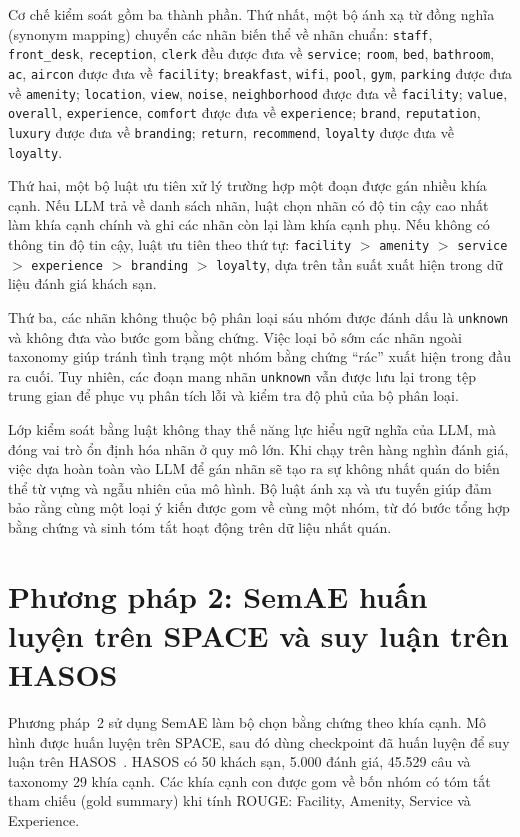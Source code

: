 \documentclass[12pt,a4paper]{report}
\begin{document}
Cơ chế kiểm soát gồm ba thành phần. Thứ nhất, một bộ ánh xạ từ đồng nghĩa (synonym mapping) chuyển các nhãn biến thể về nhãn chuẩn: \texttt{staff}, \texttt{front\_desk}, \texttt{reception}, \texttt{clerk} đều được đưa về \texttt{service}; \texttt{room}, \texttt{bed}, \texttt{bathroom}, \texttt{ac}, \texttt{aircon} được đưa về \texttt{facility}; \texttt{breakfast}, \texttt{wifi}, \texttt{pool}, \texttt{gym}, \texttt{parking} được đưa về \texttt{amenity}; \texttt{location}, \texttt{view}, \texttt{noise}, \texttt{neighborhood} được đưa về \texttt{facility}; \texttt{value}, \texttt{overall}, \texttt{experience}, \texttt{comfort} được đưa về \texttt{experience}; \texttt{brand}, \texttt{reputation}, \texttt{luxury} được đưa về \texttt{branding}; \texttt{return}, \texttt{recommend}, \texttt{loyalty} được đưa về \texttt{loyalty}.

Thứ hai, một bộ luật ưu tiên xử lý trường hợp một đoạn được gán nhiều khía cạnh. Nếu LLM trả về danh sách nhãn, luật chọn nhãn có độ tin cậy cao nhất làm khía cạnh chính và ghi các nhãn còn lại làm khía cạnh phụ. Nếu không có thông tin độ tin cậy, luật ưu tiên theo thứ tự: \texttt{facility} $>$ \texttt{amenity} $>$ \texttt{service} $>$ \texttt{experience} $>$ \texttt{branding} $>$ \texttt{loyalty}, dựa trên tần suất xuất hiện trong dữ liệu đánh giá khách sạn.

Thứ ba, các nhãn không thuộc bộ phân loại sáu nhóm được đánh dấu là \texttt{unknown} và không đưa vào bước gom bằng chứng. Việc loại bỏ sớm các nhãn ngoài taxonomy giúp tránh tình trạng một nhóm bằng chứng ``rác'' xuất hiện trong đầu ra cuối. Tuy nhiên, các đoạn mang nhãn \texttt{unknown} vẫn được lưu lại trong tệp trung gian để phục vụ phân tích lỗi và kiểm tra độ phủ của bộ phân loại.

Lớp kiểm soát bằng luật không thay thế năng lực hiểu ngữ nghĩa của LLM, mà đóng vai trò ổn định hóa nhãn ở quy mô lớn. Khi chạy trên hàng nghìn đánh giá, việc dựa hoàn toàn vào LLM để gán nhãn sẽ tạo ra sự không nhất quán do biến thể từ vựng và ngẫu nhiên của mô hình. Bộ luật ánh xạ và ưu tuyến giúp đảm bảo rằng cùng một loại ý kiến được gom về cùng một nhóm, từ đó bước tổng hợp bằng chứng và sinh tóm tắt hoạt động trên dữ liệu nhất quán.

\section{Phương pháp 2: SemAE huấn luyện trên SPACE và suy luận trên HASOS}

Phương pháp~2 sử dụng SemAE làm bộ chọn bằng chứng theo khía cạnh. Mô hình được huấn luyện trên SPACE, sau đó dùng checkpoint đã huấn luyện để suy luận trên HASOS~\cite{hasos}. HASOS có 50 khách sạn, 5.000 đánh giá, 45.529 câu và taxonomy 29 khía cạnh. Các khía cạnh con được gom về bốn nhóm có tóm tắt tham chiếu (gold summary) khi tính ROUGE: Facility, Amenity, Service và Experience.
\end{document}
